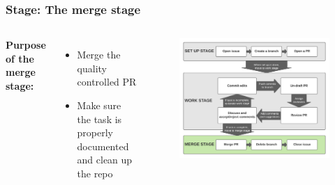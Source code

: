 \documentclass[aspectratio=169]{beamer} %
\begin{document}
\begin{frame}
	\frametitle{Stage: The merge stage}
	\begin{columns}[c]


		\Large \textbf{Purpose of the merge stage:}
		\vspace{1em}
		\normalsize
		\begin{itemize}
			\setlength\itemsep{.5em}
			\item Merge the quality controlled PR
			\item Make sure the task is properly documented and clean up the repo
		\end{itemize}

		\vspace{-.75cm}
		\begin{figure}
			\centering
			\includegraphics[width=\textwidth]{./img/branch-pr-merge-cycle-S3.png}
		\end{figure}

	\end{columns}
\end{frame}
\end{document}
